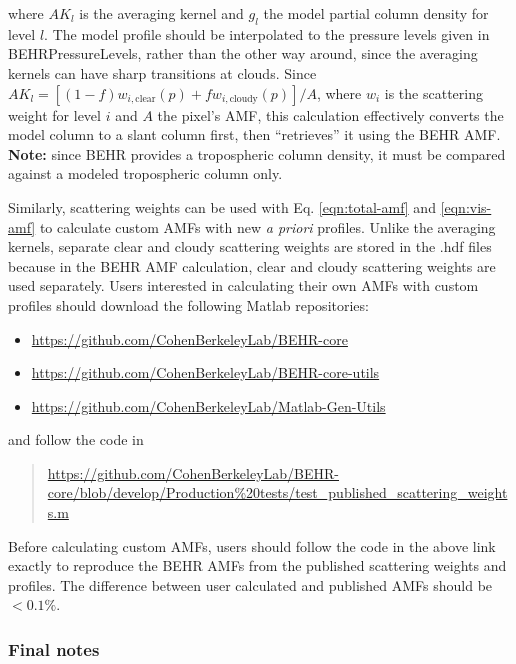 \documentclass[12pt]{article}
\begin{document}
	where $AK_l$ is the averaging kernel and $g_l$ the model  partial column density for level $l$. The model profile should be interpolated to the pressure levels given in BEHRPressureLevels, rather than the other way around, since the averaging kernels can have sharp transitions at clouds. Since $AK_l = [(1-f)w_{i,\mathrm{clear}}(p) + f w_{i,\mathrm{cloudy}}(p)]/A$, where $w_i$ is the scattering weight for level $i$ and $A$ the pixel's AMF, this calculation effectively converts the model column to a slant column first, then ``retrieves'' it using the BEHR AMF. \textbf{Note:} since BEHR provides a tropospheric  column density, it must be compared against a modeled tropospheric column only.
	
	Similarly, scattering weights can be used with Eq. \eqref{eqn:total-amf} and \eqref{eqn:vis-amf} to calculate custom AMFs with new \emph{a priori} profiles. Unlike the averaging kernels, separate clear and cloudy scattering weights are stored in the .hdf files because in the BEHR AMF calculation, clear and cloudy scattering weights are used separately.	Users interested in calculating their own AMFs with custom  profiles should download the following Matlab repositories:
	
	\begin{itemize}
	\item \url{https://github.com/CohenBerkeleyLab/BEHR-core}
	\item \url{https://github.com/CohenBerkeleyLab/BEHR-core-utils}
	\item \url{https://github.com/CohenBerkeleyLab/Matlab-Gen-Utils}
	\end{itemize}
	
	and follow the code in
	
	\begin{quote}
	\url{https://github.com/CohenBerkeleyLab/BEHR-core/blob/develop/Production%20tests/test_published_scattering_weights.m}
	\end{quote}
	
	Before calculating custom AMFs, users should follow the code in the above link exactly to reproduce the BEHR AMFs from the published scattering weights and  profiles. The difference between user calculated and published AMFs should be $< 0.1\%$.
	
	
	\subsubsection{Final notes}
	
\end{document}
